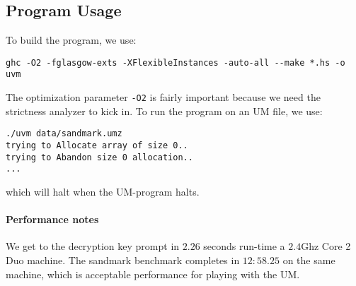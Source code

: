 \subsection*{Program Usage}

To build the program, we use:
\begin{verbatim}
ghc -O2 -fglasgow-exts -XFlexibleInstances -auto-all --make *.hs -o uvm
\end{verbatim}

The optimization parameter \texttt{-O2} is fairly important because we
need the strictness analyzer to kick in. To run the program on an UM
file, we use:
\begin{verbatim}
./uvm data/sandmark.umz
trying to Allocate array of size 0..
trying to Abandon size 0 allocation..
...
\end{verbatim}
which will halt when the UM-program halts.

\paragraph{Performance notes}

We get to the decryption key prompt in $2.26$ seconds run-time a
$2.4$Ghz Core 2 Duo machine. The sandmark benchmark completes in
$12:58.25$ on the same machine, which is acceptable performance for
playing with the UM.


